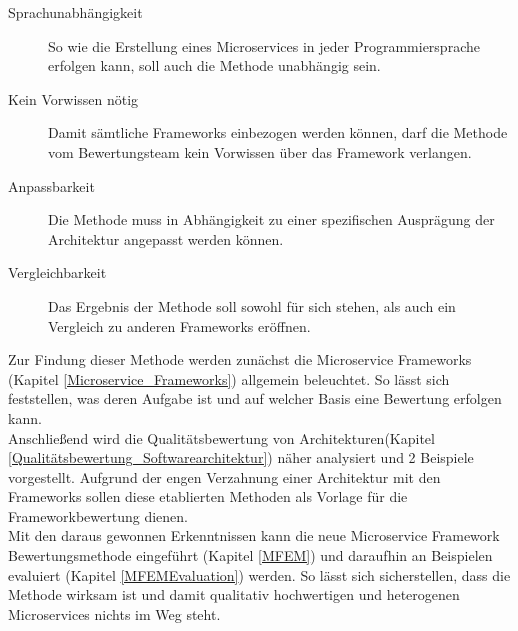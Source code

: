 \begin{description}
	\item[Sprachunabhängigkeit] 
	So wie die Erstellung eines Microservices in jeder Programmiersprache erfolgen kann, soll auch die Methode unabhängig sein.
	\item[Kein Vorwissen nötig] 
	Damit sämtliche Frameworks einbezogen werden können, darf die Methode vom Bewertungsteam kein Vorwissen über das Framework verlangen.
	\item[Anpassbarkeit] 
	Die Methode muss in Abhängigkeit zu einer spezifischen Ausprägung der Architektur angepasst werden können.
	\item[Vergleichbarkeit] 
	Das Ergebnis der Methode soll sowohl für sich stehen, als auch ein Vergleich zu anderen Frameworks eröffnen.
\end{description}

Zur Findung dieser Methode werden zunächst die Microservice Frameworks (Kapitel \ref{Microservice_Frameworks}) allgemein beleuchtet. So lässt sich feststellen, was deren Aufgabe ist und auf welcher Basis eine Bewertung erfolgen kann.\\
Anschließend wird die Qualitätsbewertung von Architekturen(Kapitel \ref{Qualitätsbewertung_Softwarearchitektur}) näher analysiert und 2 Beispiele vorgestellt. Aufgrund der engen Verzahnung einer Architektur mit den Frameworks sollen diese etablierten Methoden als Vorlage für die Frameworkbewertung dienen.\\
Mit den daraus gewonnen Erkenntnissen kann die neue Microservice Framework Bewertungsmethode eingeführt (Kapitel \ref{MFEM}) und daraufhin an Beispielen evaluiert (Kapitel \ref{MFEMEvaluation}) werden. 
So lässt sich sicherstellen, dass die Methode wirksam ist und damit qualitativ hochwertigen und heterogenen Microservices nichts im Weg steht.